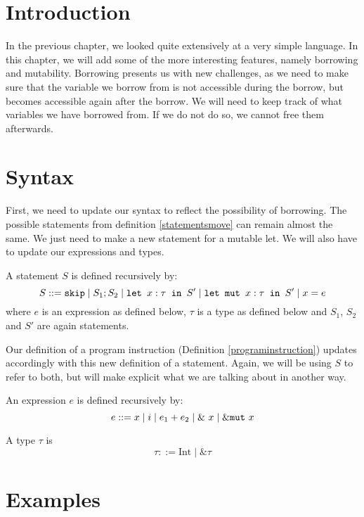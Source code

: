\section{Introduction}
In the previous chapter, we looked quite extensively at a very simple language. In this chapter, we will add some of the more interesting features, namely borrowing and mutability. Borrowing presents us with new challenges, as we need to make sure that the variable we borrow from is not accessible during the borrow, but becomes accessible again after the borrow. We will need to keep track of what variables we have borrowed from. If we do not do so, we cannot free them afterwards. 

\section{Syntax}
\label{syntaxborrow}
First, we need to update our syntax to reflect the possibility of borrowing. The possible statements from definition \ref{statementsmove} can remain almost the same. We just need to make a new statement for a mutable let. We will also have to update our expressions and types. 

\begin{definition}
\label{statementsborrow}
A statement $S$ is defined recursively by:
$$S ::= \texttt{skip} \mid S_1; S_2 \mid \texttt{let }x : \tau \texttt{ in } S' \mid \texttt{let mut }x : \tau \texttt{ in } S' \mid x = e $$
where $e$ is an expression as defined below, $\tau$ is a type as defined below and $S_1$, $S_2$ and $S'$ are again statements.
\end{definition}

Our definition of a program instruction (Definition \ref{programinstruction}) updates accordingly with this new definition of a statement. Again, we will be using $S$ to refer to both, but will make explicit what we are talking about in another way.

\begin{definition}
\label{expressionsborrow}
An expression $e$ is defined recursively by:
$$e ::= x \mid i \mid e_1 + e_2 \mid \&~x \mid \&\texttt{mut} ~x $$
\end{definition}

\begin{definition}
\label{typesborrow}
A type $\tau$ is
$$\tau ::= \textrm{Int} \mid \& \tau$$
\end{definition}

\section{Examples}

